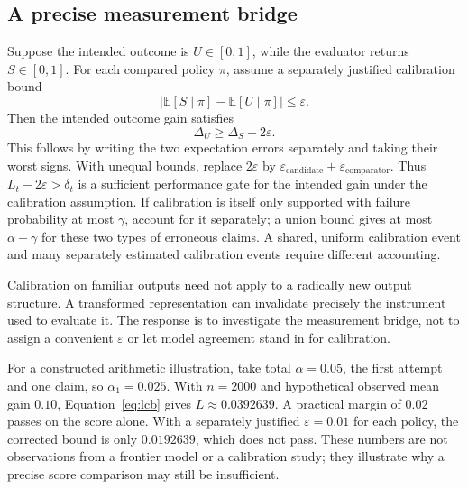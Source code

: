 \documentclass[11pt,letterpaper]{article}
\newcommand{\E}{\mathbb E}
\theoremstyle{remark}\newtheorem{remark}{Remark}[section]
\begin{document}
\subsection{A precise measurement bridge}
Suppose the intended outcome is $U\in[0,1]$, while the evaluator returns $S\in[0,1]$. For each compared policy $\pi$, assume a separately justified calibration bound
\begin{equation}
\left|\E[S\mid\pi]-\E[U\mid\pi]\right|\leq\varepsilon.
\label{eq:biasassumption}
\end{equation}
Then the intended outcome gain satisfies
\begin{equation}
\Delta_U\geq\Delta_S-2\varepsilon.
\label{eq:bridgegain}
\end{equation}
This follows by writing the two expectation errors separately and taking their worst signs. With unequal bounds, replace $2\varepsilon$ by $\varepsilon_{\mathrm{candidate}}+\varepsilon_{\mathrm{comparator}}$. Thus $L_t-2\varepsilon>\delta_t$ is a sufficient performance gate for the intended gain under the calibration assumption. If calibration is itself only supported with failure probability at most $\gamma$, account for it separately; a union bound gives at most $\alpha+\gamma$ for these two types of erroneous claims. A shared, uniform calibration event and many separately estimated calibration events require different accounting.

Calibration on familiar outputs need not apply to a radically new output structure. A transformed representation can invalidate precisely the instrument used to evaluate it. The response is to investigate the measurement bridge, not to assign a convenient $\varepsilon$ or let model agreement stand in for calibration.

For a constructed arithmetic illustration, take total $\alpha=0.05$, the first attempt and one claim, so $\alpha_1=0.025$. With $n=2000$ and hypothetical observed mean gain $0.10$, Equation~\eqref{eq:lcb} gives $L\approx0.0392639$. A practical margin of $0.02$ passes on the score alone. With a separately justified $\varepsilon=0.01$ for each policy, the corrected bound is only $0.0192639$, which does not pass. These numbers are not observations from a frontier model or a calibration study; they illustrate why a precise score comparison may still be insufficient.
\end{document}
